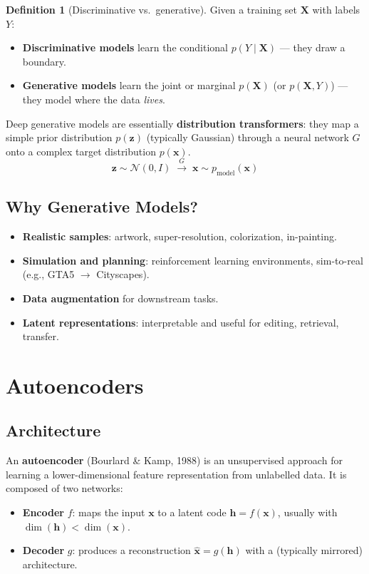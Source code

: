 \documentclass[11pt,a4paper]{article}
\theoremstyle{definition}
\newtheorem{definition}{Definition}[section]
\theoremstyle{plain}
\theoremstyle{remark}
\begin{document}
\begin{definition}[Discriminative vs.\ generative]
Given a training set $\mathbf{X}$ with labels $Y$:
\begin{itemize}
    \item \textbf{Discriminative models} learn the conditional $p(Y \mid \mathbf{X})$ --- they draw a boundary.
    \item \textbf{Generative models} learn the joint or marginal $p(\mathbf{X})$ (or $p(\mathbf{X}, Y)$) --- they model where the data \emph{lives}.
\end{itemize}
\end{definition}

Deep generative models are essentially \textbf{distribution transformers}: they map a simple prior distribution $p(\mathbf{z})$ (typically Gaussian) through a neural network $G$ onto a complex target distribution $p(\mathbf{x})$.
\[
    \mathbf{z} \sim \mathcal{N}(0, I) \;\xrightarrow{\;G\;}\; \mathbf{x} \sim p_{\text{model}}(\mathbf{x})
\]

\subsection{Why Generative Models?}

\begin{itemize}
    \item \textbf{Realistic samples}: artwork, super-resolution, colorization, in-painting.
    \item \textbf{Simulation and planning}: reinforcement learning environments, sim-to-real (e.g., GTA5 $\to$ Cityscapes).
    \item \textbf{Data augmentation} for downstream tasks.
    \item \textbf{Latent representations}: interpretable and useful for editing, retrieval, transfer.
\end{itemize}


\section{Autoencoders}

\subsection{Architecture}

An \textbf{autoencoder} (Bourlard \& Kamp, 1988) is an unsupervised approach for learning a lower-dimensional feature representation from unlabelled data. It is composed of two networks:
\begin{itemize}
    \item \textbf{Encoder} $f$: maps the input $\mathbf{x}$ to a latent code $\mathbf{h} = f(\mathbf{x})$, usually with $\dim(\mathbf{h}) < \dim(\mathbf{x})$.
    \item \textbf{Decoder} $g$: produces a reconstruction $\hat{\mathbf{x}} = g(\mathbf{h})$ with a (typically mirrored) architecture.
\end{itemize}
\end{document}
